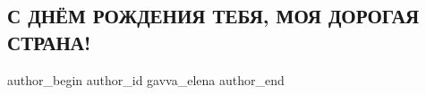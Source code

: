  
 
 
 
 
 
\subsection{С ДНЁМ РОЖДЕНИЯ ТЕБЯ, МОЯ ДОРОГАЯ СТРАНА!}
\label{sec:24_08_2021.fb.gavva_elena.1.nezalezhnist_strana}
 
\ifcmt
 author_begin
   author_id gavva_elena
 author_end
\fi
